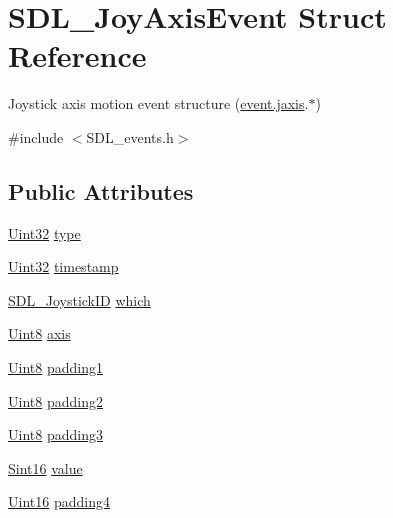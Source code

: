 \hypertarget{struct_s_d_l___joy_axis_event}{\section{S\-D\-L\-\_\-\-Joy\-Axis\-Event Struct Reference}
\label{struct_s_d_l___joy_axis_event}
}


Joystick axis motion event structure (\hyperlink{union_s_d_l___event_ac4611acd0e9c675e67dc20919f0accb4}{event.\-jaxis}.$\ast$)  




{\ttfamily \#include $<$S\-D\-L\-\_\-events.\-h$>$}

\subsection*{Public Attributes}
\begin{DoxyCompactItemize}
\item 
\hyperlink{_s_d_l__stdinc_8h_add440eff171ea5f55cb00c4a9ab8672d}{Uint32} \hyperlink{struct_s_d_l___joy_axis_event_aed1c873fb90ba58194e65f972933c67d}{type}
\item 
\hyperlink{_s_d_l__stdinc_8h_add440eff171ea5f55cb00c4a9ab8672d}{Uint32} \hyperlink{struct_s_d_l___joy_axis_event_a60ecfc70df9eeef8e33b5dd7dc060389}{timestamp}
\item 
\hyperlink{_s_d_l__joystick_8h_a3c3d32500cb08f76ee8077983912c0bd}{S\-D\-L\-\_\-\-Joystick\-I\-D} \hyperlink{struct_s_d_l___joy_axis_event_a965719f4703a7091bcc5f07f79fcf7e1}{which}
\item 
\hyperlink{_s_d_l__stdinc_8h_a2944638813a090aa23e62f4da842c3e2}{Uint8} \hyperlink{struct_s_d_l___joy_axis_event_a0beac2fb161e45771c424bd0b6daeabb}{axis}
\item 
\hyperlink{_s_d_l__stdinc_8h_a2944638813a090aa23e62f4da842c3e2}{Uint8} \hyperlink{struct_s_d_l___joy_axis_event_ae8e17bced478530638982f0382a0dafa}{padding1}
\item 
\hyperlink{_s_d_l__stdinc_8h_a2944638813a090aa23e62f4da842c3e2}{Uint8} \hyperlink{struct_s_d_l___joy_axis_event_ad5407250032f618fde7437ac5f229257}{padding2}
\item 
\hyperlink{_s_d_l__stdinc_8h_a2944638813a090aa23e62f4da842c3e2}{Uint8} \hyperlink{struct_s_d_l___joy_axis_event_a8bf5144fddc19686c2003add1f0e1565}{padding3}
\item 
\hyperlink{_s_d_l__stdinc_8h_a9d0257032c0e146ab6121bf0122712f5}{Sint16} \hyperlink{struct_s_d_l___joy_axis_event_a53ee73e7c367934dd6edb69963be5556}{value}
\item 
\hyperlink{_s_d_l__stdinc_8h_a31fcc0a076c9068668173ee26d33e42b}{Uint16} \hyperlink{struct_s_d_l___joy_axis_event_a604b258940a8cd8beaa5efeb55d6f825}{padding4}
\end{DoxyCompactItemize}


